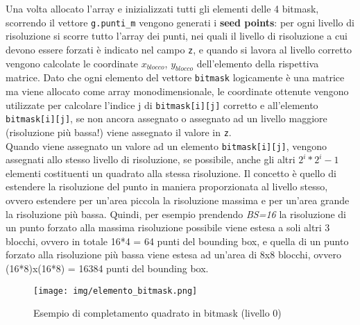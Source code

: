				Una volta allocato l'array e inizializzati tutti gli elementi delle 4 bitmask, scorrendo il vettore \texttt{g.punti\_m} vengono generati i \textbf{seed points}: per ogni livello di risoluzione si scorre tutto l'array dei punti, nei quali il livello di risoluzione a cui devono essere forzati \`{e} indicato nel campo \texttt{z}, e quando si lavora al livello corretto vengono calcolate le coordinate $x_{blocco}$, $y_{blocco}$ dell'elemento della rispettiva matrice. Dato che ogni elemento del vettore \texttt{bitmask} logicamente \`{e} una matrice ma viene allocato come array monodimensionale, le coordinate ottenute vengono utilizzate per calcolare l'indice j di \texttt{bitmask[i][j]} corretto e all'elemento \texttt{bitmask[i][j]}, se non ancora assegnato o assegnato ad un livello maggiore (risoluzione pi\`{u} bassa!) viene assegnato il valore in \texttt{z}.\\
				Quando viene assegnato un valore ad un elemento \texttt{bitmask[i][j]}, vengono assegnati allo stesso livello di risoluzione, se possibile, anche gli altri $2^i * 2^i - 1$ elementi costituenti un quadrato alla stessa risoluzione. Il concetto \`{e} quello di estendere la risoluzione del punto in maniera proporzionata al livello stesso, ovvero estendere per un'area piccola la risoluzione massima e per un'area grande la risoluzione pi\`{u} bassa. Quindi, per esempio prendendo \textit{BS=16} la risoluzione di un punto forzato alla massima risoluzione possibile viene estesa a soli altri 3 blocchi, ovvero in totale 16*4 = 64 punti del bounding box, e quella di un punto forzato alla risoluzione pi\`{u} bassa viene estesa ad un'area di 8x8 blocchi, ovvero (16*8)x(16*8) = 16384 punti del bounding box.  
				\begin{figure}[htbp]
					\centering
					\texttt{[image: img/elemento\_bitmask.png]}
					\caption{Esempio di completamento quadrato in bitmask (livello 0)}
				\end{figure}
